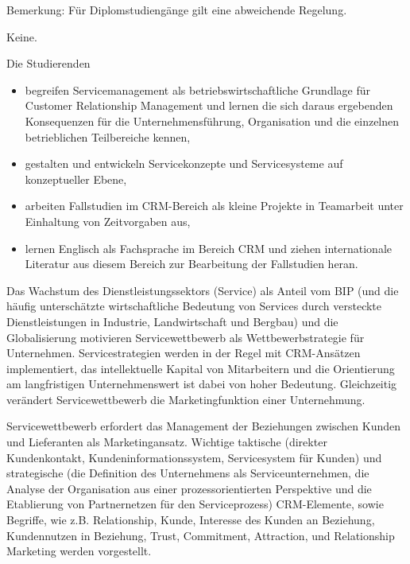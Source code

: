 \begin{course}
\begin{styleenv}
\begin{assessment}
 

Bemerkung: Für Diplomstudiengänge gilt eine abweichende Regelung.

    
\end{assessment}

\begin{conditions}Keine.\end{conditions}


\end{styleenv}

\begin{learningoutcomes}
Die Studierenden

 \begin{itemize}\item begreifen Servicemanagement als betriebswirtschaftliche Grundlage für Customer Relationship Management und lernen die sich daraus ergebenden Konsequenzen für die Unternehmensführung, Organisation und die einzelnen betrieblichen Teilbereiche kennen,  \item gestalten und entwickeln Servicekonzepte und Servicesysteme auf konzeptueller Ebene,  \item arbeiten Fallstudien im CRM-Bereich als kleine Projekte in Teamarbeit unter Einhaltung von Zeitvorgaben aus,  \item lernen Englisch als Fachsprache im Bereich CRM und ziehen internationale Literatur aus diesem Bereich zur Bearbeitung der Fallstudien heran.  \end{itemize}
\end{learningoutcomes}

\begin{content}
Das Wachstum des Dienstleistungssektors (Service) als Anteil vom BIP (und die häufig unterschätzte wirtschaftliche Bedeutung von Services durch versteckte Dienstleistungen in Industrie, Landwirtschaft und Bergbau) und die Globalisierung motivieren Servicewettbewerb als Wettbewerbstrategie für Unternehmen. Servicestrategien werden in der Regel mit CRM-Ansätzen implementiert, das intellektuelle Kapital von Mitarbeitern und die Orientierung am langfristigen Unternehmenswert ist dabei von hoher Bedeutung. Gleichzeitig verändert Servicewettbewerb die Marketingfunktion einer Unternehmung.

 

Servicewettbewerb erfordert das Management der Beziehungen zwischen Kunden und Lieferanten als Marketingansatz. Wichtige taktische (direkter Kundenkontakt, Kundeninformationssystem, Servicesystem für Kunden) und strategische (die Definition des Unternehmens als Serviceunternehmen, die Analyse der Organisation aus einer prozessorientierten Perspektive und die Etablierung von Partnernetzen für den Serviceprozess) CRM-Elemente, sowie Begriffe, wie z.B. Relationship, Kunde, Interesse des Kunden an Beziehung, Kundennutzen in Beziehung, Trust, Commitment, Attraction, und Relationship Marketing werden vorgestellt.


\end{content}
\end{course}
